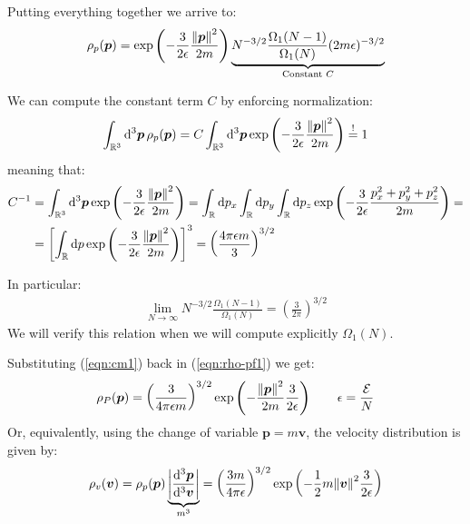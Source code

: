 \documentclass[../../main.tex]{subfiles}
\begin{document}
Putting everything together we arrive to:
\begin{align}\label{eqn:rho-pf1}
    \rho_p(\bm{p}) = \exp\left(-\frac{3}{2 \epsilon} \frac{\norm{\bm{p}}^2}{2m} \right) \underbrace{N^{-3/2} \frac{\Omega_1(N-1)}{\Omega_1(N)} (2m \epsilon)^{-3/2}}_{\text{Constant $C$}} 
\end{align}

We can compute the constant term $C$ by enforcing normalization:
\begin{align*}
    \int_{\mathbb{R}^3} \dd[3]{\bm{p}} \rho_p(\bm{p}) = C \int_{\mathbb{R}^3} \dd[3]{\bm{p}} \exp\left(-\frac{3}{2 \epsilon} \frac{\norm{\bm{p}}^2}{2m}  \right) \overset{!}{=}  1
\end{align*}
meaning that:
\begin{align}\nonumber
    C^{-1} &= \int_{\mathbb{R}^3} \dd[3]{\bm{p}} \exp\left(-\frac{3}{2 \epsilon} \frac{\norm{\bm{p}}^2}{2m}  \right) = \int_{\mathbb{R}} \dd{p_x} \int_{\mathbb{R}}\dd{p_y} \int_{\mathbb{R}} \dd{p_z} \exp\left(-\frac{3}{2 \epsilon} \frac{p_x^2 + p_y^2 + p_z^2}{2m}  \right) =\\
    &=\left[\int_{\mathbb{R}} \dd{p} \exp\left(-\frac{3}{2 \epsilon} \frac{\norm{\bm{p}}^2}{2m}  \right)\right]^3 = \left(\frac{4 \pi \epsilon m}{3} \right)^{3/2} \label{eqn:cm1}
\end{align}

In particular:
\begin{align*}
    \lim_{N \to \infty} N^{-3/2} \frac{\Omega_1(N-1)}{\Omega_1(N)}  = \left(\frac{3}{2 \pi} \right)^{3/2}
\end{align*}
We will verify this relation when we will compute explicitly $\Omega_1(N)$.

\medskip

Substituting (\ref{eqn:cm1}) back in (\ref{eqn:rho-pf1}) we get:
\begin{align} \label{eqn:rho-p-f}
    \rho_P(\bm{p}) = \left(\frac{3}{4 \pi \epsilon m} \right)^{3/2} \exp\left(-\frac{\norm{\bm{p}}^2}{2m}  \frac{3}{2 \epsilon} \right) \qquad \epsilon = \frac{\mathcal{E}}{N} 
\end{align}
Or, equivalently, using the change of variable $\bm{p} = m \bm{v}$, the velocity distribution is given by:
\begin{align} \label{eqn:rho-p-v}
    \rho_v(\bm{v}) = \rho_p(\bm{p}) \underbrace{\left|\frac{\dd[3]{\bm{p}}}{\dd[3]{\bm{v}}}\right|}_{m^3} = \left(\frac{3m}{4 \pi \epsilon} \right)^{3/2} \exp\left(-\frac{1}{2}m\norm{\bm{v}}^2 \frac{3}{2 \epsilon}  \right)
\end{align}
\end{document}
